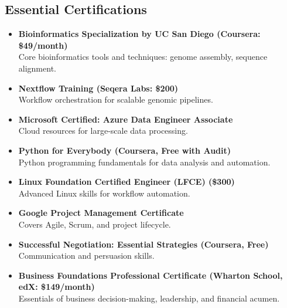 \documentclass[11pt]{report}
\newcommand{\Paid}[1]{\colorbox{Paid}{#1}}
\newcommand{\Free}[1]{\colorbox{Free}{#1}}
\newcommand{\Trial}[1]{\colorbox{Trial}{#1}}
\begin{document}
\subsection*{Essential Certifications}
\begin{itemize}[label=$\Box$, leftmargin=2em]
	\item \Free{\textbf{Bioinformatics Specialization by UC San Diego (Coursera: \$49/month)}}  \\
	Core bioinformatics tools and techniques: genome assembly, sequence alignment.
	
	\item \Paid{\textbf{Nextflow Training (Seqera Labs: \$200)}}  \\
	Workflow orchestration for scalable genomic pipelines.
	
	\item \Trial{\textbf{Microsoft Certified: Azure Data Engineer Associate}}  \\
	Cloud resources for large-scale data processing.
	
	\item \Free{\textbf{Python for Everybody (Coursera, Free with Audit)}}  \\
	Python programming fundamentals for data analysis and automation.
	
	\item \Paid{\textbf{Linux Foundation Certified Engineer (LFCE) (\$300)}}  \\
	Advanced Linux skills for workflow automation.
	
	\item \Trial{\textbf{Google Project Management Certificate}}  \\
	Covers Agile, Scrum, and project lifecycle.
	
	\item \Free{\textbf{Successful Negotiation: Essential Strategies (Coursera, Free)}}  \\
	Communication and persuasion skills.
	
	\item \Paid{\textbf{Business Foundations Professional Certificate (Wharton School, edX: \$149/month)}}  \\
	Essentials of business decision-making, leadership, and financial acumen.
\end{itemize}
\end{document}
